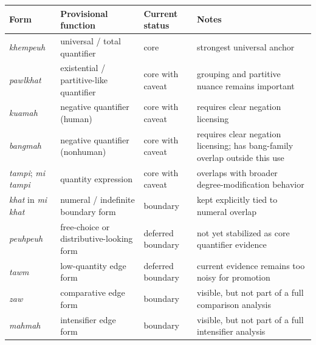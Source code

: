 \documentclass[
  11pt,
  a4paper,
]{article}
\newcounter{none} %
\newcommand{\tdim}[1]{\textit{#1}}
\begin{document}
{\def\LTcaptype{none} %
\begin{longtable}[]{@{}
  >{\raggedright\arraybackslash}p{}
  >{\raggedright\arraybackslash}p{}
  >{\raggedright\arraybackslash}p{}
  >{\raggedright\arraybackslash}p{}@{}}
\toprule\noalign{}
\begin{minipage}[b]{\linewidth}\raggedright
Form
\end{minipage} & \begin{minipage}[b]{\linewidth}\raggedright
Provisional function
\end{minipage} & \begin{minipage}[b]{\linewidth}\raggedright
Current status
\end{minipage} & \begin{minipage}[b]{\linewidth}\raggedright
Notes
\end{minipage} \\
\midrule\noalign{}
\endhead
\bottomrule\noalign{}
\endlastfoot
\tdim{khempeuh} & universal / total quantifier & core & strongest
universal anchor \\
\tdim{pawlkhat} & existential / partitive-like quantifier & core with
caveat & grouping and partitive nuance remains important \\
\tdim{kuamah} & negative quantifier (human) & core with caveat &
requires clear negation licensing \\
\tdim{bangmah} & negative quantifier (nonhuman) & core with caveat &
requires clear negation licensing; has bang-family overlap outside this
use \\
\tdim{tampi}; \tdim{mi tampi} & quantity expression & core with caveat &
overlaps with broader degree-modification behavior \\
\tdim{khat} in \tdim{mi khat} & numeral / indefinite boundary form &
boundary & kept explicitly tied to numeral overlap \\
\tdim{peuhpeuh} & free-choice or distributive-looking form & deferred
boundary & not yet stabilized as core quantifier evidence \\
\tdim{tawm} & low-quantity edge form & deferred boundary & current
evidence remains too noisy for promotion \\
\tdim{zaw} & comparative edge form & boundary & visible, but not part of
a full comparison analysis \\
\tdim{mahmah} & intensifier edge form & boundary & visible, but not part
of a full intensifier analysis \\
\end{longtable}
}
\end{document}
